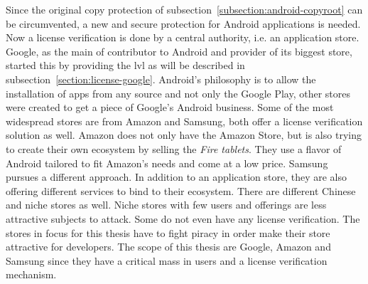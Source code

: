 Since the original copy protection of subsection~\ref{subsection:android-copyroot} can be circumvented, a new and secure protection for Android applications is needed.
Now a license verification is done by a central authority, i.e. an application store.
Google, as the main of contributor to Android and provider of its biggest store, started this by providing the \gls{lvl} as will be described in subsection~\ref{section:license-google}.
\newline
Android’s philosophy is to allow the installation of apps from any source and not only the Google Play, other stores were created to get a piece of Google's Android business.
Some of the most widespread stores are from Amazon and Samsung, both offer a license verification solution as well.
\newline
Amazon does not only have the Amazon Store, but is also trying to create their own ecosystem by selling the \textit{Fire tablets}.
They use a flavor of Android tailored to fit Amazon's needs and come at a low price.
\newline
Samsung pursues a different approach.
In addition to an application store, they are also offering different services to bind to their ecosystem.
\newline
There are different Chinese and niche stores as well.
Niche stores with few users and offerings are less attractive subjects to attack.
Some do not even have any license verification.
\newline
The stores in focus for this thesis have to fight piracy in order make their store attractive for developers.
\newline
\newline
The scope of this thesis are Google, Amazon and Samsung since they have a critical mass in users and a license verification mechanism.
